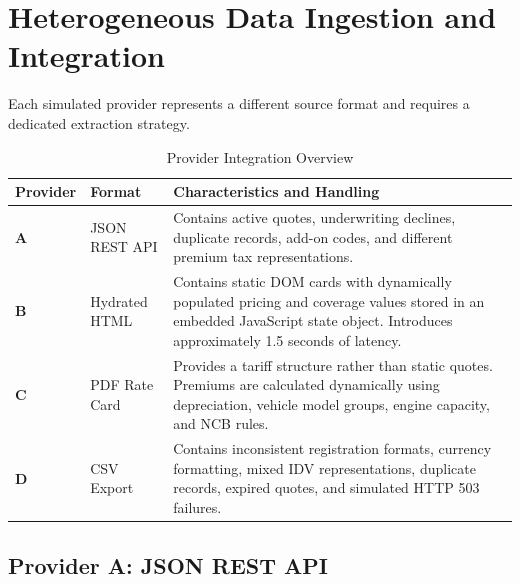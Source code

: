 \documentclass[11pt,a4paper]{article}
\begin{document}

\section{Heterogeneous Data Ingestion and Integration}

Each simulated provider represents a different source format and
requires a dedicated extraction strategy.

\begin{table}[H]
\centering
\small
\caption{Provider Integration Overview}
\begin{tabularx}{\textwidth}{L{2.2cm}L{3.1cm}Y}
\toprule
\textbf{Provider} &
\textbf{Format} &
\textbf{Characteristics and Handling} \\
\midrule

\textbf{A} &
JSON REST API &
Contains active quotes, underwriting declines, duplicate
records, add-on codes, and different premium tax representations. \\

\textbf{B} &
Hydrated HTML &
Contains static DOM cards with dynamically populated pricing
and coverage values stored in an embedded JavaScript state object.
Introduces approximately 1.5 seconds of latency. \\

\textbf{C} &
PDF Rate Card &
Provides a tariff structure rather than static quotes.
Premiums are calculated dynamically using depreciation,
vehicle model groups, engine capacity, and NCB rules. \\

\textbf{D} &
CSV Export &
Contains inconsistent registration formats, currency formatting,
mixed IDV representations, duplicate records, expired quotes,
and simulated HTTP 503 failures. \\

\bottomrule
\end{tabularx}
\end{table}


\subsection{Provider A: JSON REST API}
\end{document}
